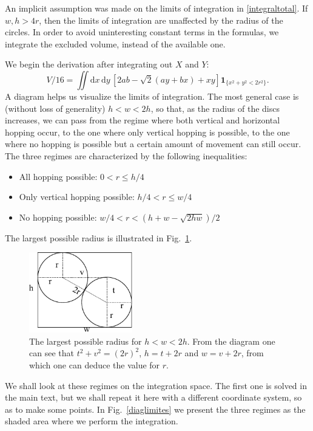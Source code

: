 \documentclass[superscriptaddress,pre,reprint,showpacs,onecolumn]{revtex4-1}
\newcommand{\rd}[1]{\mathrm{d}{#1} \,}
\newcommand{\indicatorsymbol}{\mathbf{1}}
\newcommand{\indicator}[1]{\indicatorsymbol_{ \{   #1 \} } }
\begin{document}
An implicit assumption was made on the limits of integration in \eqref{integraltotal}. If $w, h > 4r$, then the limits of integration
are unaffected by the radius of the circles.
In order to avoid uninteresting constant terms
in the formulas, we integrate
the excluded volume, instead of the available one. 

We begin the derivation after integrating out $X$ and $Y$:
\begin{equation}\label{VolumenGeneral}
V/16 =\iint \rd x \rd y \left[ 2ab-\sqrt{2}(ay+bx)+x y \right]
\indicator{x^2+y^2 < 2r^2 }.
\end{equation}
A diagram helps us visualize the limits of integration. The most general
case is (without loss of generality) $h < w < 2h$, so that, as the radius of the
discs increases, we can pass from the regime where both vertical and horizontal
hopping occur, to the one where only vertical hopping
is possible, to the one where no hopping is possible but a certain amount of movement
can still occur. The three regimes are characterized by the following inequalities:
\begin{itemize}
\item All hopping possible: $0<r \leq h/4$
\item Only vertical hopping possible: $h/4 < r \leq w/4$
\item No hopping possible: $w/4 < r < (h+w-\sqrt{2hw})/2$
\end{itemize}
The largest possible radius is illustrated in Fig.~\ref{radiomaximo}.

\begin{figure}[h]
  \centering
  \includegraphics[width=0.4\textwidth]{figures/DiagramaRadioMaximo.pdf}
  \caption{The largest possible radius for $h<w<2h$. From the diagram
    one can see that $t^2+v^2=(2r)^2$, $h=t+2r$ and $w=v+2r$, from which
    one can deduce the value for $r$.}
  \label{radiomaximo}
\end{figure}

We shall look at these regimes on the integration space. The first one is solved
in the main text, but we shall repeat it here with a different coordinate system, so as to
make some points. In Fig.~\ref{diaglimites} we present the three regimes as
the shaded area where we perform the integration. 
  
\end{document}
